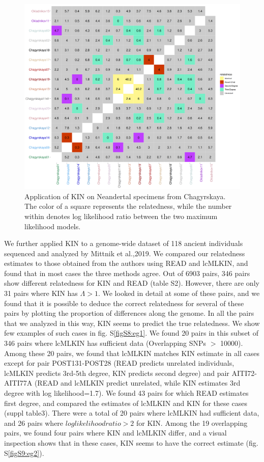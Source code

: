 \documentclass[12pt, letterpaper]{article}
\begin{document}
\begin{figure}[h!]
    \includegraphics[width=18cm]{plots/plotimg/fil0_relatable_plot.png}
    \centering
    \caption{Application of KIN on Neandertal specimens from Chagyrskaya. The color of a square represents the relatedness, while the number within denotes log likelihood ratio between the two maximum likelihood models.}
    \label{fig5:Chagyrskaya_KIN}
\end{figure}

We further applied KIN to a genome-wide dataset of 118 ancient individuals sequenced and analyzed by Mittnik et al.,2019. We compared our relatedness estimates to those obtained from the authors using READ and lcMLKIN, and found that in most cases the three methods agree. Out of 6903 pairs, 346 pairs show different relatedness for KIN and READ (table S2). However, there are only 31 pairs where KIN has $\Lambda >1$. We looked in detail at some of these pairs, and we found that it is possible to deduce the correct relatedness for several of these pairs by plotting the proportion of differences along the genome. In all the pairs that we analyzed in this way, KIN seems to predict the true relatedness. We show few examples of such cases in fig. S\ref{figS8:eg1}. We found 20 pairs in this subset of 346 pairs where lcMLKIN has sufficient data (Overlapping SNPs $>$ 10000). Among these 20 pairs, we found that lcMLKIN matches KIN estimate in all cases except for pair POST131-POST28 (READ predicts unrelated individuals, lcMLKIN predicts 3rd-5th degree, KIN predicts second degree) and pair AITI72-AITI77A (READ and lcMLKIN predict unrelated, while KIN estimates 3rd degree with log likelihood=1.7).  
We found 43 pairs for which READ estimates first degree, and compared the estimates of lcMLKIN and KIN for these cases (suppl table3). There were a total of 20 pairs where lcMLKIN had sufficient data, and 26 pairs where $loglikelihood ratio>2$ for KIN. Among the 19 overlapping pairs, we found four pairs where KIN and lcMLKIN differ, and a visual inspection shows that in these cases, KIN seems to have the correct estimate (fig. S\ref{figS9:eg2}).  
\end{document}
